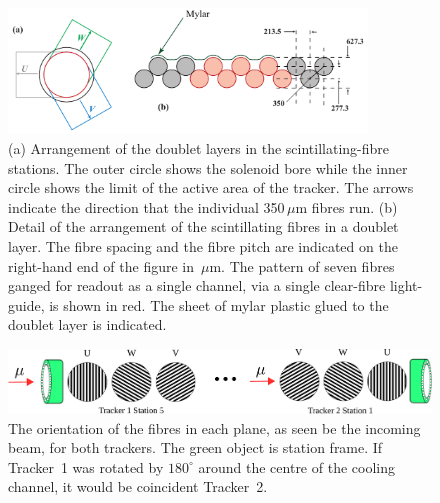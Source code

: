   \begin{figure}[tbh]
    \begin{center}
      \includegraphics[width=0.85\textwidth]{01-MICE/doublet-layer.pdf}
      \caption{\label{fig:DoubletLayer}(a) Arrangement of the doublet layers in the scintillating-fibre  stations. The outer circle shows the solenoid bore while the inner circle shows the limit of the active area of the tracker. The arrows indicate the direction that the individual 350\,$\mu$m fibres run. (b) Detail of the arrangement of the scintillating fibres in a doublet layer. The fibre spacing and the fibre pitch are indicated on the right-hand end of the figure in \,$\mu$m. The pattern of seven fibres ganged for readout as a single channel, via a single clear-fibre light-guide, is shown in red. The sheet of mylar plastic glued to the doublet layer is indicated. }
    \end{center}
  \end{figure}

  \begin{figure}[tbh]
    \centering
    \includegraphics[width=0.95\linewidth]{01-MICE/FibrePlaneOrientation.pdf} \hspace{2pc}%
    \caption{\label{fig:FibrePlaneOrientation} The orientation of the fibres in each plane, as seen be the incoming beam, for both trackers. The green object is station frame. If Tracker~1 was rotated by $180^\circ$ around the centre of the cooling channel, it would be coincident  Tracker~2.}
  \end{figure}